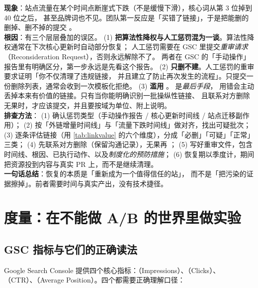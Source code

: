 \begin{pitfall}
\textbf{现象}：站点流量在某个时间点断崖式下跌（不是缓慢下滑），核心词从第 3 位掉到 40 位之后，
甚至品牌词也不见。团队第一反应是「买错了链接」，于是把能删的删掉、删不掉的提交 。\\
\textbf{根因}：有三个层层叠加的误区。
(1) \textbf{把算法性降权与人工惩罚混为一谈}。算法性降权通常在下次核心更新时自动部分恢复；
人工惩罚需要在 GSC 里提交\emph{重审请求}（Reconsideration Request），否则永远解除不了。
两者在 GSC 的「手动操作」报告里有明确区分，第一步永远是先看这个报告。
(2) \textbf{只删不建}。人工惩罚的重审要求证明「你不仅清理了违规链接，
并且建立了防止再次发生的流程」。只提交一份删除列表，通常会收到一次模板化拒绝。
(3) \textbf{滥用 }。 是\emph{最后手段}，
用错会主动丢掉本来有价值的链接。只有当你能明确识别一批操纵性链接、
且联系对方删除无果时，才应该提交，并且要按域为单位、附上说明。\\
\textbf{排查方法}：
(1) 确认惩罚类型（手动操作报告 / 核心更新时间线 / 站点迁移副作用）；
(2) 按「外链增量时间线」与「流量下跌时间线」做对齐，找出可疑批次；
(3) 逐条评估链接（用 \cref{tab:linkvalue} 的六个维度），分成「必删」「可疑」「正常」三类；
(4) 先联系对方删除（保留沟通记录），无果再 ；
(5) 写好重审文件，包含时间线、根因、已执行动作、以及\emph{制度化的预防措施}；
(6) 恢复期以季度计，期间把资源投到内容与真实 PR 上，而不是继续清理。
\\
\textbf{一句话总结}：恢复的本质是「重新成为一个值得信任的站」，
而不是「把污染的证据擦掉」。前者需要时间与真实产出，没有技术捷径。
\end{pitfall}

\section{度量：在不能做 A/B 的世界里做实验}
\label{sec:seo-measure}

\subsection{GSC 指标与它们的正确读法}

Google Search Console 提供四个核心指标：（Impressions）、（Clicks）、
（CTR）、（Average Position）。四个都需要正确理解口径：


